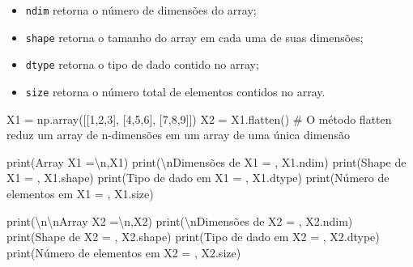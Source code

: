 \documentclass[
  brazilian,
  letterpaper,
  DIV=11,
  numbers=noendperiod]{scrreprt}
\newenvironment{Shaded}{\begin{snugshade}}{\end{snugshade}}
\newcommand{\BuiltInTok}[1]{\textcolor[rgb]{0.00,0.23,0.31}{#1}}
\newcommand{\CharTok}[1]{\textcolor[rgb]{0.13,0.47,0.30}{#1}}
\newcommand{\CommentTok}[1]{\textcolor[rgb]{0.37,0.37,0.37}{#1}}
\newcommand{\DecValTok}[1]{\textcolor[rgb]{0.68,0.00,0.00}{#1}}
\newcommand{\NormalTok}[1]{\textcolor[rgb]{0.00,0.23,0.31}{#1}}
\newcommand{\OperatorTok}[1]{\textcolor[rgb]{0.37,0.37,0.37}{#1}}
\newcommand{\StringTok}[1]{\textcolor[rgb]{0.13,0.47,0.30}{#1}}
\providecommand{\tightlist}{%
  \setlength{\itemsep}{0pt}\setlength{\parskip}{0pt}}
\begin{document}
\begin{itemize}
\tightlist
\item
  \texttt{ndim} retorna o número de dimensões do array;
\item
  \texttt{shape} retorna o tamanho do array em cada uma de suas
  dimensões;
\item
  \texttt{dtype} retorna o tipo de dado contido no array;
\item
  \texttt{size} retorna o número total de elementos contidos no array.
\end{itemize}

\begin{Shaded}
\begin{Highlighting}[]
\NormalTok{X1 }\OperatorTok{=}\NormalTok{ np.array([[}\DecValTok{1}\NormalTok{,}\DecValTok{2}\NormalTok{,}\DecValTok{3}\NormalTok{], [}\DecValTok{4}\NormalTok{,}\DecValTok{5}\NormalTok{,}\DecValTok{6}\NormalTok{], [}\DecValTok{7}\NormalTok{,}\DecValTok{8}\NormalTok{,}\DecValTok{9}\NormalTok{]]) }
\NormalTok{X2 }\OperatorTok{=}\NormalTok{ X1.flatten() }\CommentTok{\# O método flatten reduz um array de n{-}dimensões em um array de uma única dimensão}

\BuiltInTok{print}\NormalTok{(}\StringTok{\textquotesingle{}Array X1 =}\CharTok{\textbackslash{}n}\StringTok{\textquotesingle{}}\NormalTok{,X1)}
\BuiltInTok{print}\NormalTok{(}\StringTok{\textquotesingle{}}\CharTok{\textbackslash{}n}\StringTok{Dimensões de X1 = \textquotesingle{}}\NormalTok{, X1.ndim)}
\BuiltInTok{print}\NormalTok{(}\StringTok{\textquotesingle{}Shape de X1 = \textquotesingle{}}\NormalTok{, X1.shape)}
\BuiltInTok{print}\NormalTok{(}\StringTok{\textquotesingle{}Tipo de dado em X1 = \textquotesingle{}}\NormalTok{, X1.dtype)}
\BuiltInTok{print}\NormalTok{(}\StringTok{\textquotesingle{}Número de elementos em X1 = \textquotesingle{}}\NormalTok{, X1.size)}

\BuiltInTok{print}\NormalTok{(}\StringTok{\textquotesingle{}}\CharTok{\textbackslash{}n\textbackslash{}n}\StringTok{Array X2 =}\CharTok{\textbackslash{}n}\StringTok{\textquotesingle{}}\NormalTok{,X2)}
\BuiltInTok{print}\NormalTok{(}\StringTok{\textquotesingle{}}\CharTok{\textbackslash{}n}\StringTok{Dimensões de X2 = \textquotesingle{}}\NormalTok{, X2.ndim)}
\BuiltInTok{print}\NormalTok{(}\StringTok{\textquotesingle{}Shape de X2 = \textquotesingle{}}\NormalTok{, X2.shape)}
\BuiltInTok{print}\NormalTok{(}\StringTok{\textquotesingle{}Tipo de dado em X2 = \textquotesingle{}}\NormalTok{, X2.dtype)}
\BuiltInTok{print}\NormalTok{(}\StringTok{\textquotesingle{}Número de elementos em X2 = \textquotesingle{}}\NormalTok{, X2.size)}
\end{Highlighting}
\end{Shaded}
\end{document}
